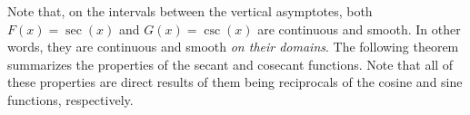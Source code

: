 \medskip



Note that, on the intervals between the vertical asymptotes, both $F(x) = \sec(x)$ and $G(x) = \csc(x)$ are continuous and smooth.  In other words, they are continuous and smooth \textit{on their domains}.
The following theorem summarizes the properties of the secant and cosecant functions.  Note that all of these properties are direct results of them being reciprocals of the cosine and sine functions, respectively.


\smallskip

